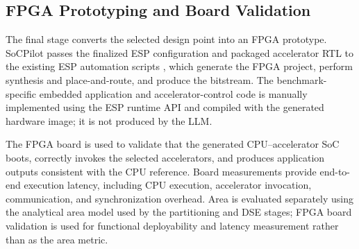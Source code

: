 \subsection{FPGA Prototyping and Board Validation}\label{sec:soc-Prototyping}
The final stage converts the selected design point into an FPGA prototype. SoCPilot passes the finalized ESP configuration and packaged accelerator RTL to the existing ESP automation scripts \cite{10.1145/3466752.3480065}, which generate the FPGA project, perform synthesis and place-and-route, and produce the bitstream. The benchmark-specific embedded application and accelerator-control code is manually implemented using the ESP runtime API and compiled with the generated hardware image; it is not produced by the LLM.

The FPGA board is used to validate that the generated CPU--accelerator SoC boots, correctly invokes the selected accelerators, and produces application outputs consistent with the CPU reference. Board measurements provide end-to-end execution latency, including CPU execution, accelerator invocation, communication, and synchronization overhead. Area is evaluated separately using the analytical area model used by the partitioning and DSE stages; FPGA board validation is used for functional deployability and latency measurement rather than as the area metric.




